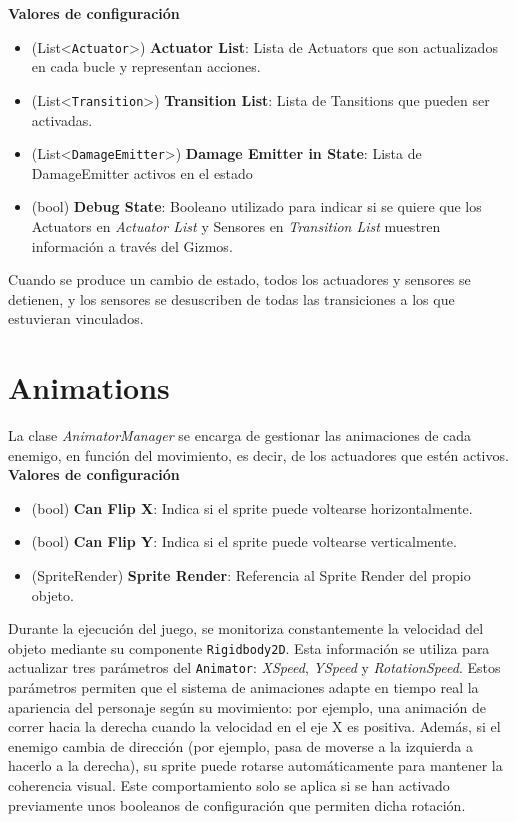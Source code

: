 \textbf{Valores de configuración}
\begin{itemize}
	\item (List<\texttt{Actuator}>) \textbf{Actuator List}: Lista de Actuators que son actualizados en cada bucle y representan acciones.
	\item (List<\texttt{Transition}>) \textbf{Transition List}: Lista de Tansitions que pueden ser activadas.
	\item (List<\texttt{DamageEmitter}>) \textbf{Damage Emitter in State}: Lista de DamageEmitter activos en el estado
	\item (bool) \textbf{Debug State}: Booleano utilizado para indicar si se quiere que los Actuators en \textit{Actuator List} y Sensores en \textit{Transition List} muestren información a través del Gizmos.
\end{itemize}
Cuando se produce un cambio de estado, todos los actuadores y sensores se detienen, y los sensores se desuscriben de todas las transiciones a los que estuvieran vinculados.\\

\section{Animations}
La clase \textit{AnimatorManager} se encarga de gestionar las animaciones de cada enemigo, en función del movimiento, es decir, de los actuadores que estén activos.\\

\textbf{Valores de configuración}
\begin{itemize}
	\item (bool) \textbf{Can Flip X}: Indica si el sprite puede voltearse horizontalmente.
	\item (bool) \textbf{Can Flip Y}: Indica si el sprite puede voltearse verticalmente. 
	\item (SpriteRender) \textbf{Sprite Render}: Referencia al Sprite Render del propio objeto.
\end{itemize}

Durante la ejecución del juego, se monitoriza constantemente la velocidad del objeto mediante su componente \texttt{Rigidbody2D}. Esta información se utiliza para actualizar tres parámetros del \texttt{Animator}: \textit{XSpeed}, \textit{YSpeed} y \textit{RotationSpeed}. Estos parámetros permiten que el sistema de animaciones adapte en tiempo real la apariencia del personaje según su movimiento: por ejemplo, una animación de correr hacia la derecha cuando la velocidad en el eje X es positiva. Además, si el enemigo cambia de dirección (por ejemplo, pasa de moverse a la izquierda a hacerlo a la derecha), su sprite puede rotarse automáticamente para mantener la coherencia visual. Este comportamiento solo se aplica si se han activado previamente unos booleanos de configuración que permiten dicha rotación.

